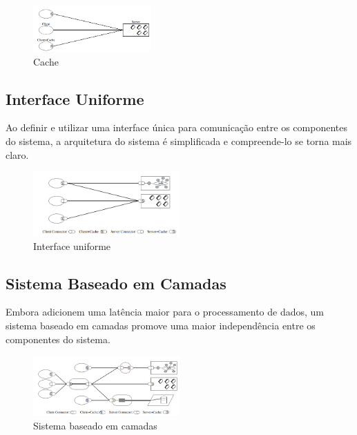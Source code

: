 \begin{figure}[ht]
\centering
\includegraphics[width=0.4\textwidth]{Cap1/rest_cache}
\caption{Cache}
\label{rest_cache}
\end{figure}

\subsection{Interface Uniforme}

Ao definir e utilizar uma interface única para comunicação entre os componentes do sistema, a arquitetura do sistema é simplificada e compreende-lo se torna mais claro.

\begin{figure}[ht]
\centering
\includegraphics[width=0.5\textwidth]{Cap1/rest_uniform_interface}
\caption{Interface uniforme}
\label{rest_uniform_interface}
\end{figure}

\subsection{Sistema Baseado em Camadas}

Embora adicionem uma latência maior para o processamento de dados, um sistema baseado em camadas promove uma maior independência entre os componentes do sistema.

\begin{figure}[ht]
\centering
\includegraphics[width=0.5\textwidth]{Cap1/rest_layer_based_system}
\caption{Sistema baseado em camadas}
\label{rest_layer_based_system}
\end{figure}

